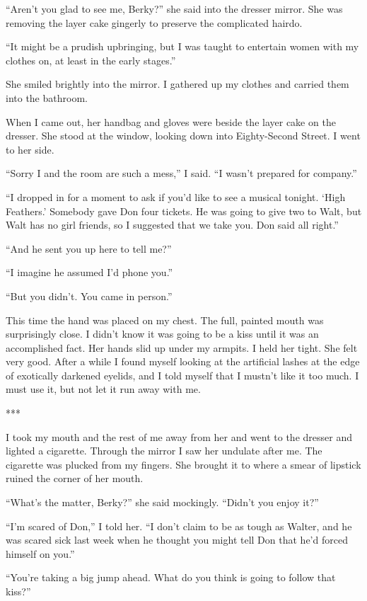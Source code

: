 \documentclass{novel}
\begin{document}
“Aren’t you glad to see me, Berky?” she said into the dresser mirror. She was removing the layer cake gingerly to preserve the complicated hairdo.

“It might be a prudish upbringing, but I was taught to entertain women with my clothes on, at least in the early stages.”

She smiled brightly into the mirror. I gathered up my clothes and carried them into the bathroom.

When I came out, her handbag and gloves were beside the layer cake on the dresser. She stood at the window, looking down into Eighty-Second Street. I went to her side.

“Sorry I and the room are such a mess,” I said. “I wasn’t prepared for company.”

“I dropped in for a moment to ask if you’d like to see a musical tonight. ‘High Feathers.’ Somebody gave Don four tickets. He was going to give two to Walt, but Walt has no girl friends, so I suggested that we take you. Don said all right.”

“And he sent you up here to tell me?”

“I imagine he assumed I’d phone you.”

“But you didn’t. You came in person.”

This time the hand was placed on my chest. The full, painted mouth was surprisingly close. I didn’t know it was going to be a kiss until it was an accomplished fact. Her hands slid up under my armpits. I held her tight. She felt very good. After a while I found myself looking at the artificial lashes at the edge of exotically darkened eyelids, and I told myself that I mustn’t like it too much. I must use it, but not let it run away with me.

***

I took my mouth and the rest of me away from her and went to the dresser and lighted a cigarette. Through the mirror I saw her undulate after me. The cigarette was plucked from my fingers. She brought it to where a smear of lipstick ruined the corner of her mouth.

“What’s the matter, Berky?” she said mockingly. “Didn’t you enjoy it?”

“I’m scared of Don,” I told her. “I don’t claim to be as tough as Walter, and he was scared sick last week when he thought you might tell Don that he’d forced himself on you.”

“You’re taking a big jump ahead. What do you think is going to follow that kiss?”
\end{document}
